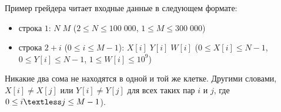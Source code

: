 \newcommand{\gt}{\textgreater} 
\newcommand{\lt}{\textless} 


Пример грейдера читает входные данные в следующем формате:
\begin{itemize}
    \item строка $1$: $N \; M$ ($2 \le N \le 100\;000$, $1 \le M \le 300\;000$)
    \item строка $2 + i$ ($0 \le i \le M - 1$): $X[i] \; Y[i] \; W[i]$ ($0 \le X[i] \le N - 1$, $0 \le Y[i] \le N - 1$, $1 \le W[i] \le 10^9$)

\end{itemize}
Никакие два сома не находятся в одной и той же клетке.
  Другими словами, $X[i] \neq X[j]$ или $Y[i] \neq Y[j]$ для всех таких пар $i$ и $j$, где $0 \le i \lt j \le M - 1$).
